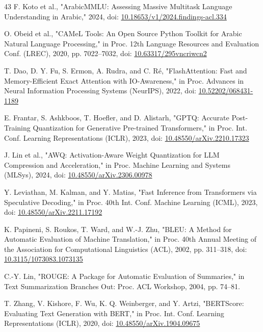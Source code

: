 \begin{thebibliography}{43}
 F. Koto et al., "ArabicMMLU: Assessing Massive Multitask Language Understanding in Arabic," 2024, doi: \href{https://doi.org/10.18653/v1/2024.findings-acl.334}{10.18653/v1/2024.findings-acl.334}

 O. Obeid et al., "CAMeL Tools: An Open Source Python Toolkit for Arabic Natural Language Processing," in Proc. 12th Language Resources and Evaluation Conf. (LREC), 2020, pp. 7022--7032, doi: \href{https://doi.org/10.63317/295vncriwcn2}{10.63317/295vncriwcn2}

 T. Dao, D. Y. Fu, S. Ermon, A. Rudra, and C. Ré, "FlashAttention: Fast and Memory-Efficient Exact Attention with IO-Awareness," in Proc. Advances in Neural Information Processing Systems (NeurIPS), 2022, doi: \href{https://doi.org/10.52202/068431-1189}{10.52202/068431-1189}

 E. Frantar, S. Ashkboos, T. Hoefler, and D. Alistarh, "GPTQ: Accurate Post-Training Quantization for Generative Pre-trained Transformers," in Proc. Int. Conf. Learning Representations (ICLR), 2023, doi: \href{https://doi.org/10.48550/arXiv.2210.17323}{10.48550/arXiv.2210.17323}

 J. Lin et al., "AWQ: Activation-Aware Weight Quantization for LLM Compression and Acceleration," in Proc. Machine Learning and Systems (MLSys), 2024, doi: \href{https://doi.org/10.48550/arXiv.2306.00978}{10.48550/arXiv.2306.00978}

 Y. Leviathan, M. Kalman, and Y. Matias, "Fast Inference from Transformers via Speculative Decoding," in Proc. 40th Int. Conf. Machine Learning (ICML), 2023, doi: \href{https://doi.org/10.48550/arXiv.2211.17192}{10.48550/arXiv.2211.17192}

 K. Papineni, S. Roukos, T. Ward, and W.-J. Zhu, "BLEU: A Method for Automatic Evaluation of Machine Translation," in Proc. 40th Annual Meeting of the Association for Computational Linguistics (ACL), 2002, pp. 311--318, doi: \href{https://doi.org/10.3115/1073083.1073135}{10.3115/1073083.1073135}

 C.-Y. Lin, "ROUGE: A Package for Automatic Evaluation of Summaries," in Text Summarization Branches Out: Proc. ACL Workshop, 2004, pp. 74--81.

 T. Zhang, V. Kishore, F. Wu, K. Q. Weinberger, and Y. Artzi, "BERTScore: Evaluating Text Generation with BERT," in Proc. Int. Conf. Learning Representations (ICLR), 2020, doi: \href{https://doi.org/10.48550/arXiv.1904.09675}{10.48550/arXiv.1904.09675}


\end{thebibliography}
